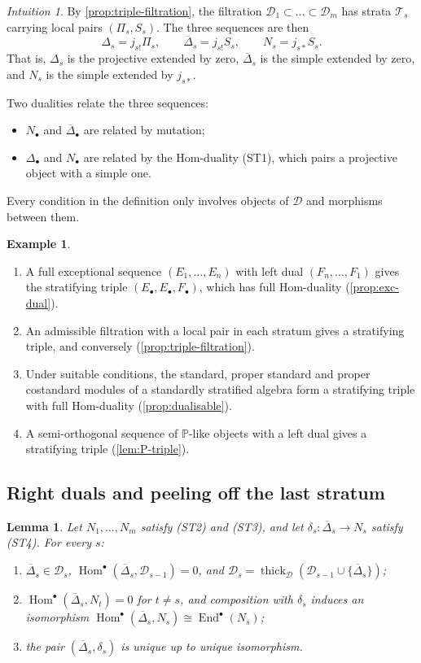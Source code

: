 \documentclass[11pt,reqno]{amsart}
\theoremstyle{plain}
\newtheorem{lemma}[theorem]{Lemma}
\theoremstyle{definition}
\newtheorem{example}[theorem]{Example}
\theoremstyle{remark}
\newtheorem*{intuition}{Intuition}
\DeclareMathOperator{\Hom}{Hom}
\DeclareMathOperator{\End}{End}
\newcommand{\thick}[2][\cD]{\operatorname{thick}_{#1}(#2)}
\newcommand{\Deltabar}{\overline{\Delta}}
\newcommand{\cD}{\mathcal{D}}
\newcommand{\cT}{\mathcal{T}}
\begin{document}
\begin{intuition}
By \cref{prop:triple-filtration}, the filtration $\cD_1\subset\dots\subset\cD_m$ has strata $\cT_s$ carrying local pairs $(\Pi_s,S_s)$. The three sequences are then
\[\Delta_s=j_{s!}\Pi_s,\qquad\Deltabar_s=j_{s!}S_s,\qquad N_s=j_{s*}S_s.\]
That is, $\Delta_s$ is the projective extended by zero, $\Deltabar_s$ is the simple extended by zero, and $N_s$ is the simple extended by $j_{s*}$.

Two dualities relate the three sequences:
\begin{itemize}
\item $N_\bullet$ and $\Deltabar_\bullet$ are related by mutation;
\item $\Delta_\bullet$ and $N_\bullet$ are related by the Hom-duality (ST1), which pairs a projective object with a simple one.
\end{itemize}
Every condition in the definition only involves objects of $\cD$ and morphisms between them.
\end{intuition}

\begin{example}\label{ex:triples}
\leavevmode
\begin{enumerate}
\item A full exceptional sequence $(E_1,\dots,E_n)$ with left dual $(F_n,\dots,F_1)$ gives the stratifying triple $(E_\bullet,E_\bullet,F_\bullet)$, which has full Hom-duality (\cref{prop:exc-dual}).
\item An admissible filtration with a local pair in each stratum gives a stratifying triple, and conversely (\cref{prop:triple-filtration}).
\item Under suitable conditions, the standard, proper standard and proper costandard modules of a standardly stratified algebra form a stratifying triple with full Hom-duality (\cref{prop:dualisable}).
\item A semi-orthogonal sequence of $\mathbb{P}$-like objects with a left dual gives a stratifying triple (\cref{lem:P-triple}).
\end{enumerate}
\end{example}

\subsection{Right duals and peeling off the last stratum}

\begin{lemma}\label{lem:right-dual}
Let $N_1,\dots,N_m$ satisfy (ST2) and (ST3), and let $\delta_s\colon\Deltabar_s\to N_s$ satisfy (ST4). For every $s$:
\begin{enumerate}
\item $\Deltabar_s\in\cD_s$, $\Hom^\bullet(\Deltabar_s,\cD_{s-1})=0$, and $\cD_s=\thick{\cD_{s-1}\cup\{\Deltabar_s\}}$;
\item $\Hom^\bullet(\Deltabar_s,N_t)=0$ for $t\ne s$, and composition with $\delta_s$ induces an isomorphism $\Hom^\bullet(\Deltabar_s,N_s)\cong\End^\bullet(N_s)$;
\item the pair $(\Deltabar_s,\delta_s)$ is unique up to unique isomorphism.
\end{enumerate}
\end{lemma}
\end{document}

